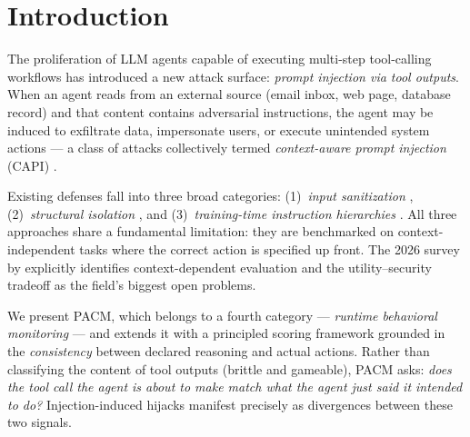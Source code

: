 \documentclass[11pt,letterpaper]{article}
\newcommand{\pacm}{\textsc{PACM}}
\begin{document}
\section{Introduction}
\label{sec:intro}

The proliferation of LLM agents capable of executing multi-step tool-calling
workflows has introduced a new attack surface: \emph{prompt injection via tool
outputs}. When an agent reads from an external source (email inbox, web page,
database record) and that content contains adversarial instructions, the agent
may be induced to exfiltrate data, impersonate users, or execute unintended
system actions --- a class of attacks collectively termed
\emph{context-aware prompt injection} (CAPI)
\citep{Greshake2023NotWhatYouSignedUp}.

Existing defenses fall into three broad categories: (1)~\emph{input
sanitization} \citep{Liu2023PromptInjectionAttack}, (2)~\emph{structural
isolation} \citep{Debenedetti2025CaMeL}, and (3)~\emph{training-time
instruction hierarchies} \citep{Wallace2024InstructionHierarchy}. All three
approaches share a fundamental limitation: they are benchmarked on
context-independent tasks where the correct action is specified up front.
The 2026 survey by \citet{Wang2026AgentPI} explicitly identifies
context-dependent evaluation and the utility--security tradeoff as the
field's biggest open problems.

We present \pacm{}, which belongs to a fourth category --- \emph{runtime
behavioral monitoring} --- and extends it with a principled scoring framework
grounded in the \emph{consistency} between declared reasoning and actual
actions. Rather than classifying the content of tool outputs (brittle and
gameable), \pacm{} asks: \emph{does the tool call the agent is about to make
match what the agent just said it intended to do?} Injection-induced hijacks
manifest precisely as divergences between these two signals.
\end{document}
